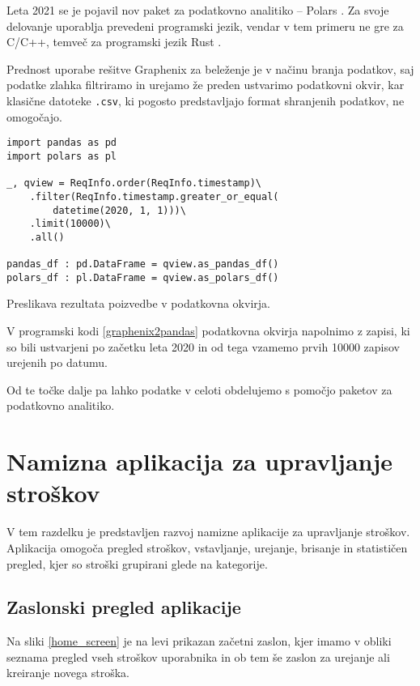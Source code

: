 \documentclass[a4paper,12pt,openright]{book}
\begin{document}
    Leta 2021 se je pojavil nov paket za podatkovno analitiko – Polars \cite{POLARS}. Za svoje delovanje uporablja prevedeni programski jezik, vendar v tem primeru ne gre za C/C++, temveč za programski jezik Rust \cite{RUST}.

    Prednost uporabe rešitve Graphenix za beleženje je v načinu branja podatkov, saj podatke zlahka filtriramo in urejamo že preden ustvarimo podatkovni okvir, kar klasične datoteke {\tt .csv}, ki pogosto predstavljajo format shranjenih podatkov, ne omogočajo.

\begin{code}
\begin{verbatim}
import pandas as pd
import polars as pl

_, qview = ReqInfo.order(ReqInfo.timestamp)\
    .filter(ReqInfo.timestamp.greater_or_equal(
        datetime(2020, 1, 1)))\
    .limit(10000)\
    .all()

pandas_df : pd.DataFrame = qview.as_pandas_df()
polars_df : pl.DataFrame = qview.as_polars_df()
\end{verbatim}
\caption{Preslikava rezultata poizvedbe v podatkovna okvirja.}
\label{graphenix2pandas}
\end{code}

    \noindent
    V programski kodi \ref{graphenix2pandas} podatkovna okvirja napolnimo z zapisi, ki so bili ustvarjeni po začetku leta 2020 in od tega vzamemo prvih \num{10000} zapisov urejenih po datumu.

    Od te točke dalje pa lahko podatke v celoti obdelujemo s pomočjo paketov za podatkovno analitiko.

    \newpage
    \section{Namizna aplikacija za upravljanje stroškov}

    V tem razdelku je predstavljen razvoj namizne aplikacije za upravljanje stroškov. Aplikacija omogoča pregled stroškov, vstavljanje, urejanje, brisanje in statističen pregled, kjer so stroški grupirani glede na kategorije.

    \subsection{Zaslonski pregled aplikacije}
    Na sliki \ref{home_screen} je na levi prikazan začetni zaslon, kjer imamo v obliki seznama pregled vseh stroškov uporabnika in ob tem še zaslon za urejanje ali kreiranje novega stroška. 
    
\end{document}
